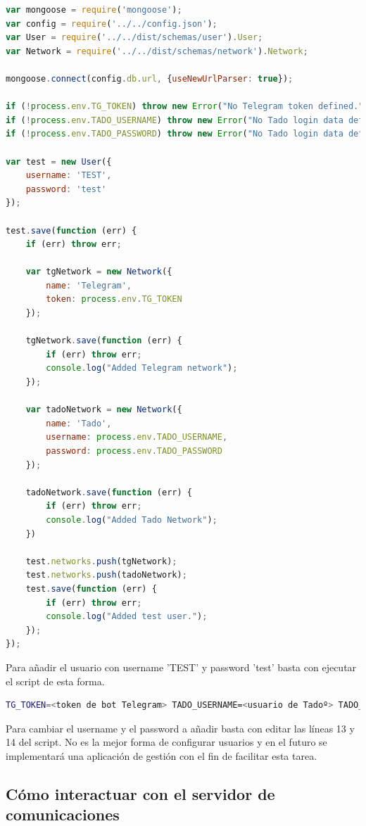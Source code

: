 \documentclass[spanish,12pt, a4paper, twoside]{paper}
\begin{document}
\begin{lstlisting}[language=Javascript]
var mongoose = require('mongoose');
var config = require('../../config.json');
var User = require('../../dist/schemas/user').User;
var Network = require('../../dist/schemas/network').Network;

mongoose.connect(config.db.url, {useNewUrlParser: true});

if (!process.env.TG_TOKEN) throw new Error("No Telegram token defined.");
if (!process.env.TADO_USERNAME) throw new Error("No Tado login data defined.");
if (!process.env.TADO_PASSWORD) throw new Error("No Tado login data defined.");

var test = new User({
	username: 'TEST',
	password: 'test'
});

test.save(function (err) {
	if (err) throw err;

	var tgNetwork = new Network({
		name: 'Telegram',
		token: process.env.TG_TOKEN
	});

	tgNetwork.save(function (err) {
		if (err) throw err;
		console.log("Added Telegram network");
	});

	var tadoNetwork = new Network({
		name: 'Tado',
		username: process.env.TADO_USERNAME,
		password: process.env.TADO_PASSWORD
	});

	tadoNetwork.save(function (err) {
		if (err) throw err;
		console.log("Added Tado Network");
	})

	test.networks.push(tgNetwork);
	test.networks.push(tadoNetwork);
	test.save(function (err) {
		if (err) throw err;
		console.log("Added test user.");
	});
});
\end{lstlisting}

Para añadir el usuario con username 'TEST' y password 'test' basta con ejecutar el script de esta forma.

\begin{lstlisting}[language=sh]
TG_TOKEN=<token de bot Telegram> TADO_USERNAME=<usuario de Tadoº> TADO_PASSWORD=<contraseña de Tadoº> nodejs ./add-mocha-user.js
\end{lstlisting}

Para cambiar el username y el password a añadir basta con editar las líneas 13 y 14 del script. No es la mejor forma de configurar usuarios y en el futuro se implementará una aplicación de gestión con el fin de facilitar esta tarea.

\subsection{Cómo interactuar con el servidor de comunicaciones}
\end{document}
